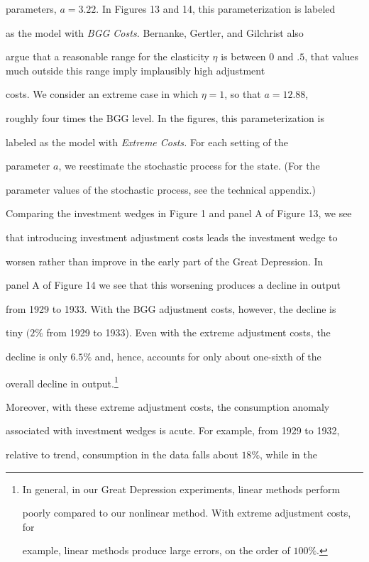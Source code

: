 \documentclass[fleqn,leqno,11pt]{article}
\begin{document}
parameters, $a=3.22.$ In Figures 13 and 14, this parameterization is labeled

as the model with \emph{BGG Costs. }Bernanke, Gertler, and Gilchrist also

argue that a reasonable range for the elasticity $\eta $ is between $0$ and $%

.5$, that values much outside this range imply implausibly high adjustment

costs. We consider an extreme case in which $\eta =1$, so that $a=12.88$,

roughly four times the BGG level. In the figures, this parameterization is

labeled as the model with \emph{Extreme Costs. }For each setting of the

parameter $a$, we reestimate the stochastic process for the state. (For the

parameter values of the stochastic process, see the technical appendix.)



Comparing the investment wedges in Figure 1 and panel A of Figure 13, we see

that introducing investment adjustment costs leads the investment wedge to

worsen rather than improve in the early part of the Great Depression. In

panel A of Figure 14 we see that this worsening produces a decline in output

from 1929 to 1933. With the BGG adjustment costs, however, the decline is

tiny $(2\%$ from 1929 to 1933). Even with the extreme adjustment costs, the

decline is only $6.5\%$ and, hence, accounts for only about one-sixth of the

overall decline in output.\footnote{%

In general, in our Great Depression experiments, linear methods perform

poorly compared to our nonlinear method. With extreme adjustment costs, for

example, linear methods produce large errors, on the order of $100\%$.}

Moreover, with these extreme adjustment costs, the consumption anomaly

associated with investment wedges is acute. For example, from 1929 to 1932,

relative to trend, consumption in the data falls about $18\%$, while in the
\end{document}
